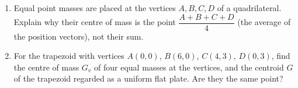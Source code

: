 \begin{enumerate}
\item[(a)] Equal point masses are placed at the vertices $A,B,C,D$ of a quadrilateral. Explain why their centre of mass is the point $\dfrac{A+B+C+D}{4}$ (the average of the position vectors), not their sum.
\item[(b)] For the trapezoid with vertices $A(0,0)$, $B(6,0)$, $C(4,3)$, $D(0,3)$, find the centre of mass $G_v$ of four equal masses at the vertices, and the centroid $G$ of the trapezoid regarded as a uniform flat plate. Are they the same point?
\end{enumerate}
